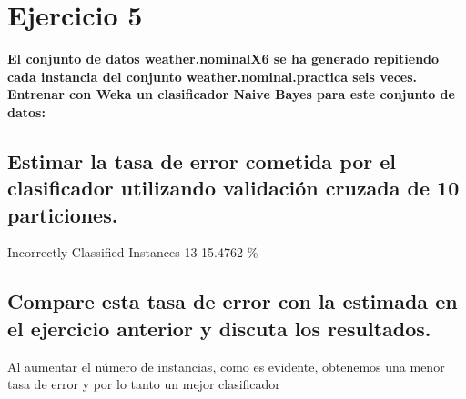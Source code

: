 \documentclass{article}
\begin{document}
\newpage

\section{Ejercicio 5}

\textbf{El conjunto de datos weather.nominalX6 se ha generado repitiendo cada instancia del
conjunto weather.nominal.practica seis veces. Entrenar con Weka un clasificador Naive
Bayes para este conjunto de datos:}

\vspace{1cm}

\subsection{Estimar la tasa de error cometida por el clasificador utilizando validación cruzada de 10 particiones.}

\hspace{1cm} Incorrectly Classified Instances   \hspace{0.5cm}     13         \hspace{0.5cm}      15.4762 \%

\vspace{1cm}

\subsection{Compare esta tasa de error con la estimada en el ejercicio anterior y discuta los
resultados.}

\hspace{1cm}Al aumentar el número de instancias, como es evidente, obtenemos una menor tasa de error y por lo tanto un mejor clasificador
\end{document}
